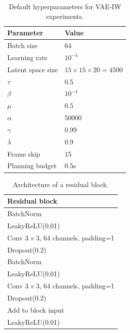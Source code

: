 \vspace{5pt}
\begin{table}[ht]
    \centering
    \begin{tabular}{l l}
        \toprule
        \textbf{Parameter} & \textbf{Value} \\
        \midrule
        Batch size & 64\\
        Learning rate & $10^{-4}$\\
        Latent space size & $15 \times 15 \times 20 = 4500$ \\
        $\tau$ & 0.5\\
        $\beta$ & $10^{-4}$\\
        $\mu$ & $0.5$\\
        $\alpha$ & 50000\\
        $\gamma$ & 0.99 \\
        $\lambda$ & 0.9 \\
        Frame skip & 15\\
        Planning budget & 0.5s\\
        \bottomrule
    \end{tabular}
    \caption{Default hyperparameters for VAE-IW experiments.}
    \label{tab:constant}
\end{table}
\begin{table}[ht]
    \centering %
    \begin{tabular}{l}
        \toprule
        \textbf{Residual block}\\
        \midrule
        BatchNorm\\
        LeakyReLU(0.01)\\
        Conv $3 \times 3$, 64 channels, padding=1\\
        Dropout(0.2)\\
        BatchNorm\\
        LeakyReLU(0.01)\\
        Conv $3 \times 3$, 64 channels, padding=1\\
        Dropout(0.2)\\
        Add to block input \\
        LeakyReLU(0.01)\\
        \bottomrule
    \end{tabular}
    \caption{Architecture of a residual block.}
    \label{tab:residualblock}
\end{table}
